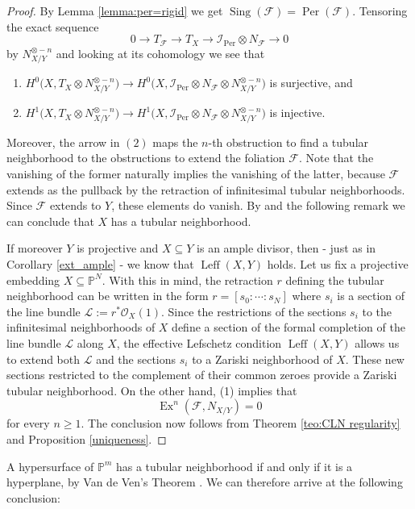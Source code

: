 \documentclass[reqno]{amsart}
\theoremstyle{plain}
\renewcommand\P{\mathbb{P}}
\newcommand{\I}{\mathcal{I}}
\newcommand{\OO}{\mathcal{O}}
\renewcommand{\I}{\mathcal{I}}
\renewcommand{\L}{\mathcal{L}}
\newcommand{\F}{\mathscr{F}}
\DeclareMathOperator{\Ex}{Ex}
\DeclareMathOperator{\Sing}{Sing}
\DeclareMathOperator{\Per}{Per}
\DeclareMathOperator{\Leff}{Leff}
\newcounter{Theorem}
\theoremstyle{definition}
\theoremstyle{named}
\begin{document}
\begin{proof} 
By Lemma \ref{lemma:per=rigid} we get $\Sing(\F) = \Per(\F)$.
Tensoring the exact sequence
\[
0\rightarrow T_\F \rightarrow T_X \rightarrow \I_{\Per} \otimes N_\F\rightarrow 0
\]
by $N_{X/Y}^{\otimes -n}$ and looking at its cohomology we see that
\begin{enumerate}
    \item $H^0\big(X,T_X\otimes N_{X/Y}^{\otimes -n}\big)\rightarrow H^0\big(X,\I_{\Per}\otimes N_\F\otimes N_{X/Y}^{\otimes -n}\big)$ is surjective, and
    \item $H^1\big(X,T_X\otimes N_{X/Y}^{\otimes -n}\big)\rightarrow H^1\big(X,\I_{\Per}\otimes N_\F\otimes N_{X/Y}^{\otimes -n}\big)$ is injective.
\end{enumerate}
Moreover, the arrow in $(2)$ maps the $n$-th obstruction to find a tubular neighborhood to the obstructions to extend the foliation $\F$. Note that the vanishing of the former naturally implies the vanishing of the latter, because $\F$ extends as the pullback by the retraction of infinitesimal tubular neighborhoods. Since $\F$ extends to $Y$, these elements do vanish. By \cite[Theorem II]{griffiths1966extension} and the following remark we can conclude that $X$ has a tubular neighborhood. 

If moreover $Y$ is projective and $X\subseteq Y$ is an ample divisor, then - just as in Corollary \ref{ext_ample} - we know that $\Leff(X,Y)$ holds. 
Let us fix a projective embedding $X\subseteq \P^N$. With this in mind, the retraction $r$ defining the tubular neighborhood can be written in the form  $r=[s_0:\cdots:s_N]$ where $s_i$ is a section of the line bundle $\L:=r^*\OO_X(1)$. Since the restrictions of the sections $s_i$ to the infinitesimal neighborhoods of $X$ define a section of the formal completion of the line bundle $\L$ along $X$, the effective Lefschetz condition  $\Leff(X,Y)$ allows us to extend both $\L$ and the sections $s_i$ to a Zariski neighborhood of $X$. These new sections restricted to the complement of their common zeroes provide a Zariski tubular neighborhood.
On the other hand, (1) implies that $$\Ex^n(\F,N_{X/Y})=0$$ for every $n\geq 1$. The conclusion now follows from Theorem \ref{teo:CLN regularity} and Proposition \ref{uniqueness}.
\end{proof}


A hypersurface of $\P^m$ has a tubular neighborhood if and only if it is a hyperplane, by Van de Ven's Theorem \cite[Theorem 7.1]{badescu2012projective}. We can therefore arrive at the following conclusion:
\end{document}
